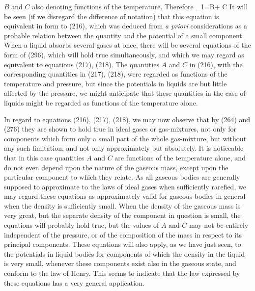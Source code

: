 \documentclass[12pt]{memoir}
\begin{document}
$B$ and $C$ also denoting functions of the temperature. Therefore
\eqs \mu_1=B+ C \log {} \label{296}\eqe
It will be seen (if we disregard the difference of notation) that this equation is equivalent in form to (216), which was deduced from \textit{a priori} considerations as a probable relation between the quantity and the potential of a small component. When a liquid absorbs several gases at once, there will be several equations of the form of (296), which will hold true simultaneously, and which we may regard as equivalent to equations (217), (218). The quantities $A$ and $C$ in (216), with the corresponding quantities in (217), (218), were regarded as functions of the temperature and pressure, but since the potentials in liquids are but little affected by the pressure, we might anticipate that these quantities in the case of liquids might be regarded as functions of the temperature alone.


In regard to equations (216), (217), (218), we may now observe that by (264) and (276) they are shown to hold true in ideal gases or gas-mixtures, not only for components which form only a small part of the whole gas-mixture, but without any such limitation, and not only approximately but absolutely. It is noticeable that in this case quantities $A$ and $C$ are functions of the temperature alone, and do not even depend upon the nature of the gaseous mass, except upon the particular component to which they relate. As all gaseous bodies are generally supposed to approximate to the laws of ideal gases when sufficiently rarefied, we may regard these equations as approximately valid for gaseous bodies in general when the density is sufficiently small. When the density of the gaseous mass is very great, but the separate density of the component in question is small, the equations will probably hold true, but the values of $A$ and $C$ may not be entirely independent of the pressure, or of the composition of the mass in respect to its principal components. These equations will also apply, as we have just seen, to the potentials in liquid bodies for components of which the density in the liquid is very small, whenever these components exist also in the gaseous state, and conform to the law of Henry. This seems to indicate that the law expressed by these equations has a very general application.

\end{document}
